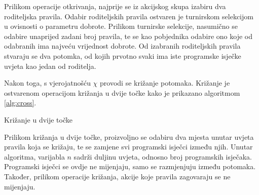 \documentclass[times, utf8, zavrsni]{fer}
\begin{document}
Prilikom operacije otkrivanja, najprije se iz akcijskog skupa izabiru dva roditeljska pravila.
Odabir roditeljskih pravila ostvaren je turnirskom selekcijom  u ovisnosti o parametru dobrote.
Prilikom turnirske selekcije, nasumično se odabire unaprijed zadani broj pravila, te se kao pobjednika odabire ono koje od odabranih ima najveću vrijednost dobrote.
Od izabranih roditeljskih pravila stvaraju se dva potomka, od kojih prvotno svaki ima iste programske isječke uvjeta kao jedan od roditelja.

Nakon toga, s vjerojatnošću $\chi$ provodi se križanje potomaka.
Križanje je ostvarenom operacijom križanja u dvije točke  kako je prikazano algoritmom \ref{alg:cross}.
\begin{algorithm}[h]
    \caption{Križanje u dvije točke}
    \label{alg:cross}
    \begin{algorithmic}
        \STATE{$x :=$ proizvoljan decimalni broj iz intervala [0, n)}
        \STATE{$y :=$ proizvoljan decimalni broj iz intervala [0, n)}
        \ENDIF
        \ENDFOR
    \end{algorithmic}
\end{algorithm}
Prilikom križanja u dvije točke, proizvoljno se odabiru dva mjesta unutar uvjeta pravila koja se križaju, te se zamjene svi programski isječci između njih.
Unutar algoritma, varijabla $n$ sadrži duljinu uvjeta, odnosno broj programskih isječaka.
Programski isječci se ovdje ne mijenjaju, samo se razmjenjuju između potomaka.
Također, prilikom operacije križanja, akcije koje pravila zagovaraju se ne mijenjaju.
\end{document}

